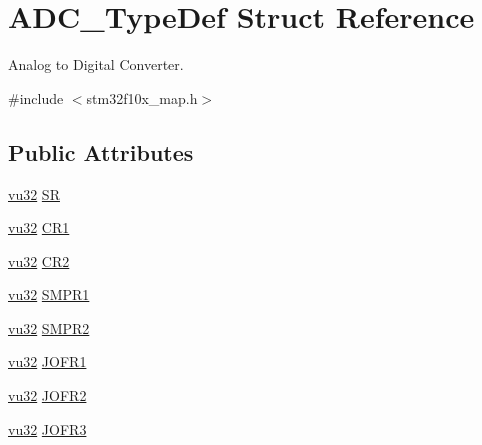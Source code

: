 \hypertarget{struct_a_d_c___type_def}{}\section{A\+D\+C\+\_\+\+Type\+Def Struct Reference}
\label{struct_a_d_c___type_def}


Analog to Digital Converter.  




{\ttfamily \#include $<$stm32f10x\+\_\+map.\+h$>$}

\subsection*{Public Attributes}
\begin{DoxyCompactItemize}
\item 
\hyperlink{agilefox_2library_2inc_2stm32f10x__type_8h_a6e2761f0a1011f84ed96b946f2c8a563}{vu32} \hyperlink{struct_a_d_c___type_def_a69f03eaa828c80ac9b2d34ed13d6b798}{SR}
\item 
\hyperlink{agilefox_2library_2inc_2stm32f10x__type_8h_a6e2761f0a1011f84ed96b946f2c8a563}{vu32} \hyperlink{struct_a_d_c___type_def_ad92260b54f77ad20d6c805d4d33d6ebb}{C\+R1}
\item 
\hyperlink{agilefox_2library_2inc_2stm32f10x__type_8h_a6e2761f0a1011f84ed96b946f2c8a563}{vu32} \hyperlink{struct_a_d_c___type_def_a801ba5b7d448bc007b648ffdd118ca4f}{C\+R2}
\item 
\hyperlink{agilefox_2library_2inc_2stm32f10x__type_8h_a6e2761f0a1011f84ed96b946f2c8a563}{vu32} \hyperlink{struct_a_d_c___type_def_accf9b05406df69b8bd905f187894d5b5}{S\+M\+P\+R1}
\item 
\hyperlink{agilefox_2library_2inc_2stm32f10x__type_8h_a6e2761f0a1011f84ed96b946f2c8a563}{vu32} \hyperlink{struct_a_d_c___type_def_ad8d4a246376e7ed436007a2c5efb2631}{S\+M\+P\+R2}
\item 
\hyperlink{agilefox_2library_2inc_2stm32f10x__type_8h_a6e2761f0a1011f84ed96b946f2c8a563}{vu32} \hyperlink{struct_a_d_c___type_def_a0b5d22c29cd9536d500b47325b433a3c}{J\+O\+F\+R1}
\item 
\hyperlink{agilefox_2library_2inc_2stm32f10x__type_8h_a6e2761f0a1011f84ed96b946f2c8a563}{vu32} \hyperlink{struct_a_d_c___type_def_ae0fe51e21716103577ed2611ea83f956}{J\+O\+F\+R2}
\item 
\hyperlink{agilefox_2library_2inc_2stm32f10x__type_8h_a6e2761f0a1011f84ed96b946f2c8a563}{vu32} \hyperlink{struct_a_d_c___type_def_a85b3d6f855c7afe9bc73913cfc757251}{J\+O\+F\+R3}

\end{DoxyCompactItemize}
